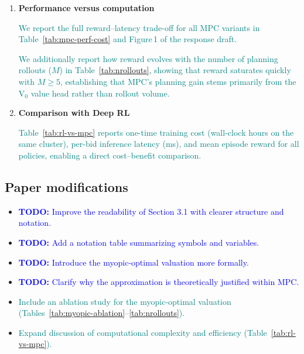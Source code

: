 \documentclass[11pt]{article}
\newcommand{\todo}[1]{\textcolor{blue}{\textbf{TODO:} #1}}
\newcommand{\done}[1]{\textcolor{teal}{#1}}
\begin{document}
\begin{enumerate}[leftmargin=*]

\item \textbf{Performance versus computation}

\done{We report the full reward--latency trade-off for all MPC variants in
      Table~\ref{tab:mpc-perf-cost} and Figure\,1 of the response draft.}

\done{We additionally report how reward evolves with the number of planning rollouts
      ($M$) in Table~\ref{tab:nrollouts}, showing that reward saturates quickly with
      $M\ge 5$, establishing that MPC's planning gain stems primarily from the V$_0$
      value head rather than rollout volume.}

\item \textbf{Comparison with Deep RL}

\done{Table~\ref{tab:rl-vs-mpc} reports one-time training cost (wall-clock hours on
      the same cluster), per-bid inference latency (ms), and mean episode reward for all
      policies, enabling a direct cost--benefit comparison.}

\end{enumerate}

\subsection*{Paper modifications}

\begin{itemize}

\item \todo{Improve the readability of Section 3.1 with clearer structure and notation.}

\item \todo{Add a notation table summarizing symbols and variables.}

\item \todo{Introduce the myopic-optimal valuation more formally.}

\item \todo{Clarify why the approximation is theoretically justified within MPC.}

\item \done{Include an ablation study for the myopic-optimal valuation (Tables~\ref{tab:myopic-ablation}--\ref{tab:nrollouts}).}

\item \done{Expand discussion of computational complexity and efficiency
      (Table~\ref{tab:rl-vs-mpc}).}

\end{itemize}
\end{document}

